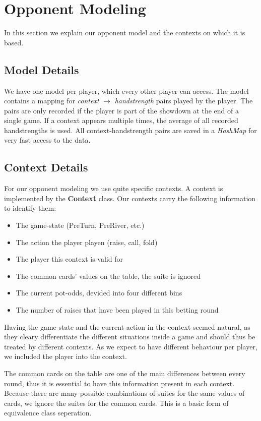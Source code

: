 \section{Opponent Modeling}
In this section we explain our opponent model and the contexts on which it is based.

\subsection{Model Details}
We have one model per player, which every other player can access. The model contains a mapping for \textit{context}
$ \rightarrow $ \textit{handstrength} pairs played by the player. The pairs are only recorded if the player is part of the showdown at
the end of a single game. If a context appears multiple times, the average of all recorded handstrengths is used. All
context-handstrength pairs are saved in a \textit{HashMap} for very fast access to the data.

\subsection{Context Details}
For our opponent modeling we use quite specific contexts. A context is implemented by the \textbf{Context} class.
Our contexts carry the following information to identify them:
\begin{itemize}
    \item The game-state (PreTurn, PreRiver, etc.)
    \item The action the player playen (raise, call, fold)
    \item The player this context is valid for
    \item The common cards' values on the table, the suite is ignored
    \item The current pot-odds, devided into four different bins
    \item The number of raises that have been played in this betting round
\end{itemize}
Having the game-state and the current action in the context seemed natural, as they cleary differentiate the different
situations inside a game and should thus be treated by different contexts. As we expect to have different behaviour per
player, we included the player into the context.

The common cards on the table are one of the main differences between every round, thus it is essential to have this
information present in each context. Because there are many possible combinations of suites for the same values of
cards, we ignore the suites for the common cards. This is a basic form of equivalence class seperation.

